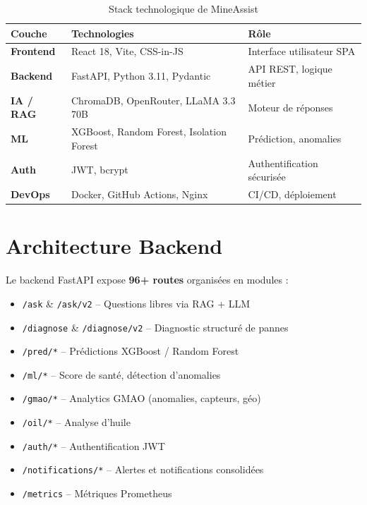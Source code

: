 \documentclass[12pt,a4paper]{report}
\begin{document}
\begin{table}[H]
\centering
\begin{tabular}{>{\bfseries}p{3cm} p{5cm} p{5cm}}
\toprule
\textcolor{ocpGreen}{Couche} & \textcolor{ocpGreen}{Technologies} & \textcolor{ocpGreen}{Rôle} \\
\midrule
Frontend & React 18, Vite, CSS-in-JS & Interface utilisateur SPA \\
\addlinespace
Backend & FastAPI, Python 3.11, Pydantic & API REST, logique métier \\
\addlinespace
IA / RAG & ChromaDB, OpenRouter, LLaMA 3.3 70B & Moteur de réponses \\
\addlinespace
ML & XGBoost, Random Forest, Isolation Forest & Prédiction, anomalies \\
\addlinespace
Auth & JWT, bcrypt & Authentification sécurisée \\
\addlinespace
DevOps & Docker, GitHub Actions, Nginx & CI/CD, déploiement \\
\bottomrule
\end{tabular}
\caption{Stack technologique de MineAssist}
\end{table}

\section{Architecture Backend}

Le backend FastAPI expose \textbf{96+ routes} organisées en modules :

\begin{itemize}
  \item \texttt{/ask} \& \texttt{/ask/v2} -- Questions libres via RAG + LLM
  \item \texttt{/diagnose} \& \texttt{/diagnose/v2} -- Diagnostic structuré de pannes
  \item \texttt{/pred/*} -- Prédictions XGBoost / Random Forest
  \item \texttt{/ml/*} -- Score de santé, détection d'anomalies
  \item \texttt{/gmao/*} -- Analytics GMAO (anomalies, capteurs, géo)
  \item \texttt{/oil/*} -- Analyse d'huile
  \item \texttt{/auth/*} -- Authentification JWT
  \item \texttt{/notifications/*} -- Alertes et notifications consolidées
  \item \texttt{/metrics} -- Métriques Prometheus
\end{itemize}
\end{document}
